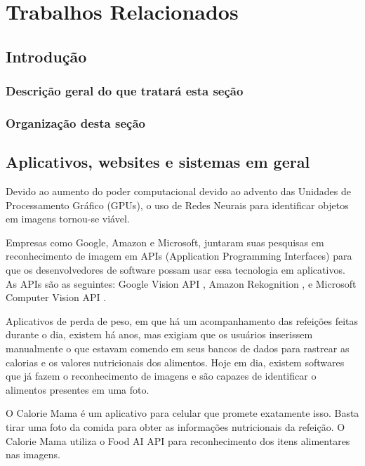 \section{Trabalhos Relacionados \label{sec:trab_rel}}

\subsection*{Introdução}

\subsubsection*{Descrição geral do que tratará esta seção}
\subsubsection*{Organização desta seção}

\subsection{Aplicativos, websites e sistemas em geral \label{subsec:app_web}}

Devido ao aumento do poder computacional devido ao advento das Unidades de Processamento Gráfico (GPUs), o uso de Redes Neurais para identificar objetos em imagens tornou-se viável.

Empresas como Google, Amazon e Microsoft, juntaram suas pesquisas em reconhecimento de imagem em APIs (Application Programming Interfaces) para que os desenvolvedores de software possam usar essa tecnologia em aplicativos. As APIs são as seguintes: Google Vision API \cite{google_vision}, Amazon Rekognition \cite{amazon_rekognition}, e Microsoft Computer Vision API \cite{azure_microsoft_computer_vision}.

Aplicativos de perda de peso, em que há um acompanhamento das refeições feitas durante o dia, existem há anos, mas exigiam que os usuários inserissem manualmente o que estavam comendo em seus bancos de dados para rastrear as calorias e os valores nutricionais dos alimentos. Hoje em dia, existem softwares que já fazem o reconhecimento de imagens e são capazes de identificar o alimentos presentes em uma foto.

O Calorie Mama \cite{caloriemama_2016} é um aplicativo para celular que promete exatamente isso. Basta tirar uma foto da comida para obter as informações nutricionais da refeição. O Calorie Mama utiliza o Food AI API para reconhecimento dos itens alimentares nas imagens.

